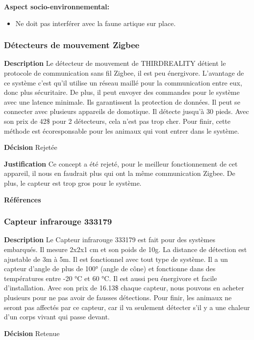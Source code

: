 \noindent\textbf{Aspect socio-environnemental:}
\begin{itemize}
    \item Ne doit pas interférer avec la faune artique sur place.
\end{itemize}


\subsubsection{Détecteurs de mouvement Zigbee}
\noindent\textbf{Description} Le détecteur de mouvement de THIRDREALITY détient le protocole de communication sans fil Zigbee, il est peu énergivore. L’avantage de ce système c’est qu’il utilise un réseau maillé pour la communication entre eux, donc plus sécuritaire. De plus, il peut envoyer des commandes pour le système avec une latence minimale. Ils garantissent la protection de données. Il peut se connecter avec plusieurs appareils de domotique. Il détecte jusqu’à 30 pieds. Avec son prix de 42\$ pour 2 détecteurs, cela n’est pas trop cher. Pour finir, cette méthode est écoresponsable pour les animaux qui vont entrer dans le système.  

\noindent\textbf{Décision} Rejetée

\noindent\textbf{Justification} Ce concept a été rejeté, pour le meilleur fonctionnement de cet appareil, il nous en faudrait plus qui ont la même communication Zigbee. De plus, le capteur est trop gros pour le système.  

\noindent\textbf{Références}
\cite{Gopro1}
\cite{Gopro2}

\subsubsection{Capteur infrarouge 333179}
\noindent\textbf{Description} Le Capteur infrarouge 333179 est fait pour des systèmes embarqués. Il mesure 2x2x1 cm et son poids de 10g.  La distance de détection est ajustable de 3m à 5m. Il est fonctionnel avec tout type de système. Il a un capteur d’angle de plus de 100° (angle de cône) et fonctionne dans des températures entre -20 °C et 60 °C. Il est aussi peu énergivore et facile d’installation. Avec son prix de 16.13\$ chaque capteur, nous pouvons en acheter plusieurs pour ne pas avoir de fausses détections. Pour finir, les animaux ne seront pas affectés par ce capteur, car il va seulement détecter s’il y a une chaleur d’un corps vivant qui passe devant.  

\noindent\textbf{Décision} Retenue

